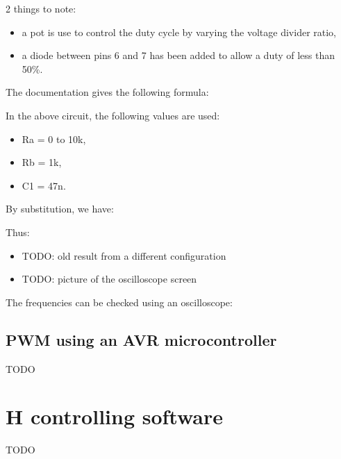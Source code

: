 \documentclass[12pt]{article}
\begin{document}
2 things to note:
\begin{itemize}
\item a pot is use to control the duty cycle by varying the voltage divider ratio,
\item a diode between pins 6 and 7 has been added to allow a duty of less than 50\%.
\end{itemize}

The documentation gives the following formula:
\begin{center}
\end{center}

In the above circuit, the following values are used:
\begin{itemize}
\item Ra = 0 to 10k,
\item Rb = 1k,
\item C1 = 47n.
\end{itemize}

By substitution, we have:
\begin{center}
\end{center}

Thus:
\begin{center}
\end{center}

\begin{itemize}
\item TODO: old result from a different configuration
\item TODO: picture of the oscilloscope screen
\end{itemize}
The frequencies can be checked using an oscilloscope:
\begin{center}
\end{center}

\subsection{PWM using an AVR microcontroller}
TODO

\newpage
\section{H controlling software}
TODO
\end{document}
